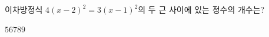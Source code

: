 이차방정식 $4(x-2)^2=3(x-1)^2$의 두 근 사이에 있는 정수의 개수는?
\begin{choices32}{$5$}{$6$}{$7$}{$8$}{$9$}\end{choices32}
